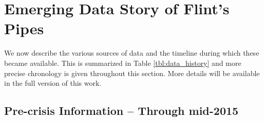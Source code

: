 \documentclass[sigconf]{acmart}
\begin{document}
\begin{comment}
The \textsc{StatisticalModel} is a predictive model which output a likelihood of hazardous or safe materials for a home's water service line. This model is based on an implementation of gradient boosted decision trees known as \emph{XGBoost} \citep{chen2016xgboost}. The ensemble methods, such as \emph{XGBoost}, is highly effective in practice, but they implicitly assume independence of pipe materials across \emph{neighboring} homes -- intuitively this should be false, and indeed the neighborhood correlations are empirically quite strong in Flint's case. To incorporate geographic correlation of service line material, we implement an autoregressive Bayesian spatial model \citep{gelfand2003proper,lee2011comparison}, which  re-calibration the output probabilities.


The development of the \textsc{DecisionRule} routine borrows heavily from the literature on \emph{active learning} \citep{balcan2013statistical,balcan2010true,liu2008active}, which imagines a supervised learning setting in which labeled examples are not given a priori but instead can be actively queried by the learning algorithm. A number of algorithmic and analytical tools have been developed for various active learbalcan2013statistical,balcan2010true,liu2008activening settings, but here we take advantage of the Importance Weighted Active Learning (IWAL) framework \citep{beygelzimer2009importance} which, in short, queries labels according to a biased sampling procedure. As implemented in our \textsc{DecisionRule} routine, this effectively guides the inspection process to target homes with higher levels of uncertainty according to \textsc{StatisticalModel}.
\end{comment}

\section{Emerging Data Story of Flint's Pipes}
\label{sec:data_availability}

We now describe the various sources of data and the timeline during which these became available. This is summarized in Table \ref{tbl:data_history} and more precise chronology is given throughout this section. More details will be available in the full version of this work.


\subsection{Pre-crisis Information -- Through mid-2015} \label{sec:precrisisdata}
\end{document}
